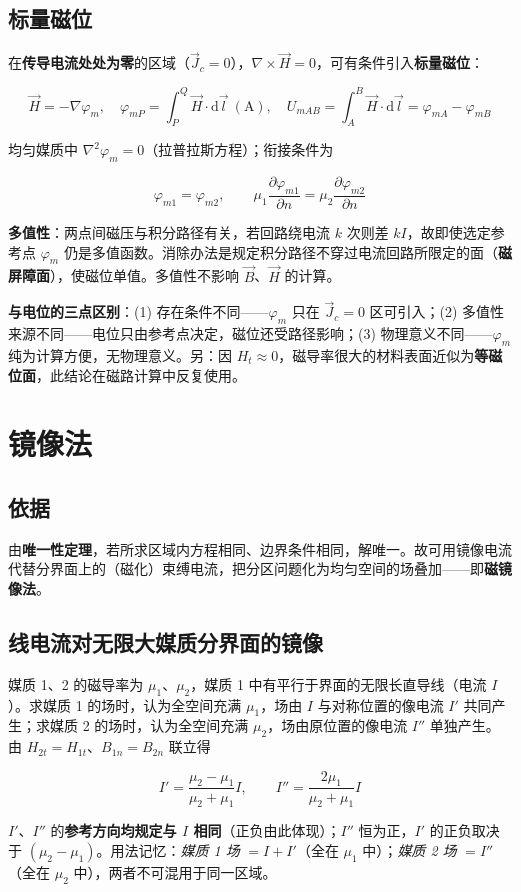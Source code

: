 \subsection{标量磁位}
在\textbf{传导电流处处为零}的区域（$\vec{J}_c=0$），$\nabla\times\vec{H}=0$，可有条件引入\textbf{标量磁位}：
\begin{formulaBox}
\[
\vec{H}=-\nabla\varphi_m,
\quad
\varphi_{mP}=\int_P^Q\vec{H}\cdot\mathrm{d}\vec{l}\ (\mathrm{A}),
\quad
U_{mAB}=\int_A^B\vec{H}\cdot\mathrm{d}\vec{l}=\varphi_{mA}-\varphi_{mB}
\]
\end{formulaBox}
均匀媒质中 $\nabla^2\varphi_m=0$（拉普拉斯方程）；衔接条件为
\begin{formulaBox}
\[
\varphi_{m1}=\varphi_{m2},
\qquad
\mu_1\frac{\partial\varphi_{m1}}{\partial n}=\mu_2\frac{\partial\varphi_{m2}}{\partial n}
\]
\end{formulaBox}
\textbf{多值性}：两点间磁压与积分路径有关，若回路绕电流 $k$ 次则差 $kI$，故即使选定参考点 $\varphi_m$ 仍是多值函数。消除办法是规定积分路径不穿过电流回路所限定的面（\textbf{磁屏障面}），使磁位单值。多值性不影响 $\vec{B}$、$\vec{H}$ 的计算。

\textbf{与电位的三点区别}：(1) 存在条件不同——$\varphi_m$ 只在 $\vec{J}_c=0$ 区可引入；(2) 多值性来源不同——电位只由参考点决定，磁位还受路径影响；(3) 物理意义不同——$\varphi_m$ 纯为计算方便，无物理意义。另：因 $H_t\approx0$，磁导率很大的材料表面近似为\textbf{等磁位面}，此结论在磁路计算中反复使用。


\section{镜像法}

\subsection{依据}
由\textbf{唯一性定理}，若所求区域内方程相同、边界条件相同，解唯一。故可用镜像电流代替分界面上的（磁化）束缚电流，把分区问题化为均匀空间的场叠加——即\textbf{磁镜像法}。

\subsection{线电流对无限大媒质分界面的镜像}
媒质 1、2 的磁导率为 $\mu_1$、$\mu_2$，媒质 1 中有平行于界面的无限长直导线（电流 $I$）。求媒质 1 的场时，认为全空间充满 $\mu_1$，场由 $I$ 与对称位置的像电流 $I'$ 共同产生；求媒质 2 的场时，认为全空间充满 $\mu_2$，场由原位置的像电流 $I''$ 单独产生。由 $H_{2t}=H_{1t}$、$B_{1n}=B_{2n}$ 联立得
\begin{formulaBox}
\[
I'=\frac{\mu_2-\mu_1}{\mu_2+\mu_1}I,
\qquad
I''=\frac{2\mu_1}{\mu_2+\mu_1}I
\]
\end{formulaBox}
$I'$、$I''$ 的\textbf{参考方向均规定与 $I$ 相同}（正负由此体现）；$I''$ 恒为正，$I'$ 的正负取决于 $(\mu_2-\mu_1)$。用法记忆：\emph{媒质 1 场} $=I+I'$（全在 $\mu_1$ 中）；\emph{媒质 2 场} $=I''$（全在 $\mu_2$ 中），两者不可混用于同一区域。

